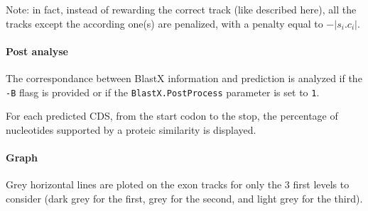 Note: in fact, instead of rewarding the correct track (like described
here), all the tracks except the according one(s) are penalized, with
a penalty equal to $-|s_i .c_i|$.

\paragraph{Post analyse}

The correspondance between BlastX information and prediction is
analyzed if the \texttt{-B} flasg  is provided or if the
\texttt{BlastX.PostProcess} parameter is set to \texttt{1}.

For each predicted CDS, from the start codon to the stop, the
percentage of nucleotides supported by a proteic similarity is
displayed.

\paragraph{Graph}

Grey horizontal lines are ploted on the exon tracks for only the 3
first levels to consider (dark grey for the first, grey for the
second, and light grey for the third).

